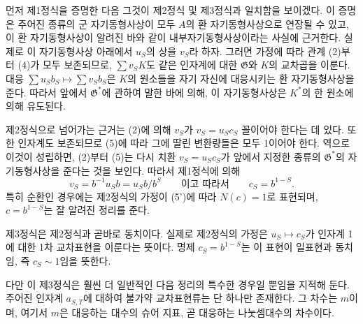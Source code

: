 
먼저 제1정식을 증명한 다음 그것이 제2정식 및 제3정식과 일치함을 보이겠다. 이 증명은 주어진 종류의 군 자기동형사상이 모두 \(A\)의 환 자기동형사상으로 연장될 수 있고, 이 환 자기동형사상이 알려진 바와 같이 내부자기동형사상이라는 사실에 근거한다. 실제로 이 자기동형사상 아래에서 \(u_S\)의 상을 \(v_S\)라 하자. 그러면 가정에 따라 관계 (2)부터 (4)가 모두 보존되므로, \(\sum v_SK\)도 같은 인자계에 대한 \(\mathfrak G\)와 \(K\)의 교차곱을 이룬다. 대응 \(\sum u_Sb_S\mapsto\sum v_Sb_S\)은 \(K\)의 원소들을 자기 자신에 대응시키는 환 자기동형사상을 준다. 따라서 앞에서 \(\mathfrak G^*\)에 관하여 말한 바에 의해, 이 자기동형사상은 \(K^*\)의 한 원소에 의해 유도된다.

제2정식으로 넘어가는 근거는 (2)에 의해 \(v_S\)가 \(v_S=u_Sc_S\) 꼴이어야 한다는 데 있다. 또한 인자계도 보존되므로 (5)에 따라 그에 딸린 변환량들은 모두 1이어야 한다. 역으로 이것이 성립하면, (2)부터 (5)는 다시 치환 \(v_S=u_Sc_S\)가 앞에서 지정한 종류의 \(\mathfrak G^*\)의 자기동형사상을 준다는 것을 보인다. 따라서 제1정식에 의해
\[
v_S=b^{-1}u_Sb=u_Sb/b^S\qquad\text{이고 따라서}\qquad c_S=b^{1-S}.
\]
특히 순환인 경우에는 제2정식의 가정이 (5')에 따라 \(N(c)=1\)로 표현되며, \(c=b^{1-S}\)는 잘 알려진 정리를 준다.

제3정식은 제2정식과 곧바로 동치이다. 실제로 제2정식의 가정은 \(u_S\mapsto c_S\)가 인자계 1에 대한 1차 교차표현을 이룬다는 뜻이다. 명제 \(c_S=b^{1-S}\)는 이 표현이 일표현과 동치임, 즉 \(c_S\sim1\)임을 뜻한다.

다만 이 제3정식은 훨씬 더 일반적인 다음 정리의 특수한 경우일 뿐임을 지적해 둔다. 주어진 인자계 \(a_{S,T}\)에 대하여 불가약 교차표현류는 단 하나만 존재한다. 그 차수는 \(m\)이며, 여기서 \(m\)은 대응하는 대수의 슈어 지표, 곧 대응하는 나눗셈대수의 차수이다.
